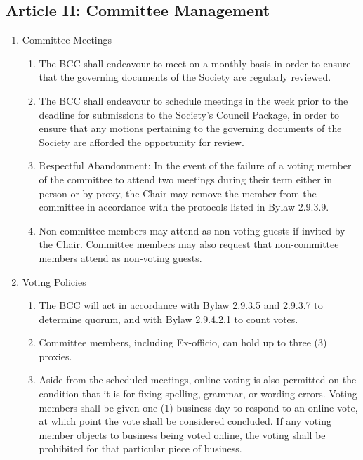 \subsection{Article II: Committee Management}
\begin{enumerate}[label*=\arabic*., align=left]	
\item Committee Meetings
\begin{enumerate}[label*=\arabic*., align=left]	
\item The BCC shall endeavour to meet on a monthly basis in order to ensure that the governing documents of the Society are regularly reviewed.
\item The BCC shall endeavour to schedule meetings in the week prior to the deadline for submissions to the Society's Council Package, in order to ensure that any motions pertaining to the governing documents of the Society are afforded the opportunity for review.
\item Respectful Abandonment: In the event of the failure of a voting member of the committee to attend two meetings during their term either in person or by proxy, the Chair may remove the member from the committee in accordance with the protocols listed in Bylaw 2.9.3.9.
\item Non-committee members may attend as non-voting guests if invited by the Chair. Committee members may also request that non-committee members attend as non-voting guests.
\end{enumerate}

\item Voting Policies
\begin{enumerate}[label*=\arabic*., align=left]	
\item The BCC  will act in accordance with Bylaw 2.9.3.5 and 2.9.3.7 to determine quorum, and with Bylaw 2.9.4.2.1 to count votes.
\item Committee members, including Ex-officio, can hold up to three (3) proxies.
\item Aside from the scheduled meetings, online voting is also permitted on the condition that it is for fixing spelling, grammar, or wording errors. Voting members shall be given one (1) business day to respond to an online vote, at which point the vote shall be considered concluded. If any voting member objects to business being voted online, the voting shall be prohibited for that particular piece of business.
\end{enumerate}

\end{enumerate}

